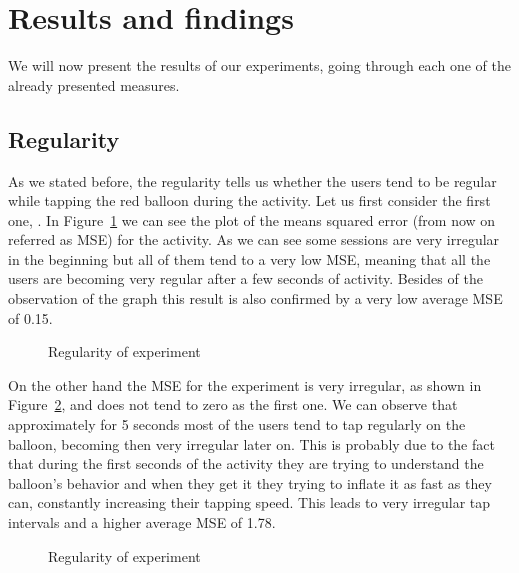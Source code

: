 \section{Results and findings}
We will now present the results of our experiments, going through each one of the already presented measures.

\subsection{Regularity}
As we stated before, the regularity tells us whether the users tend to be regular while tapping the red balloon during the activity. Let us first consider the first one, \testfirst. In Figure~\ref{fig:reg1} we can see the plot of the means squared error (from now on referred as MSE) for the activity. As we can see some sessions are very irregular in the beginning but all of them tend to a very low MSE, meaning that all the users are becoming very regular after a few seconds of activity. Besides of the observation of the graph this result is also confirmed by a very low average MSE of 0.15.


\begin{figure}[h!t]
\centering
	{\setlength{\fboxsep}{1.5pt}
	 }
\caption{Regularity of \testfirst experiment}
\label{fig:reg1}
\end{figure}

On the other hand the MSE for the \testsecond experiment is very irregular, as shown in Figure~\ref{fig:reg2}, and does not tend to zero as the first one. We can observe that approximately for 5 seconds most of the users tend to tap regularly on the balloon, becoming then very irregular later on. This is probably due to the fact that during the first seconds of the activity they are trying to understand the balloon's behavior and when they get it they trying to inflate it as fast as they can, constantly increasing their tapping speed. This leads to very irregular tap intervals and a higher average MSE of 1.78.

\begin{figure}[h!t]
\centering
	{\setlength{\fboxsep}{1.5pt}
	 }
\caption{Regularity of \testsecond experiment}
\label{fig:reg2}
\end{figure}